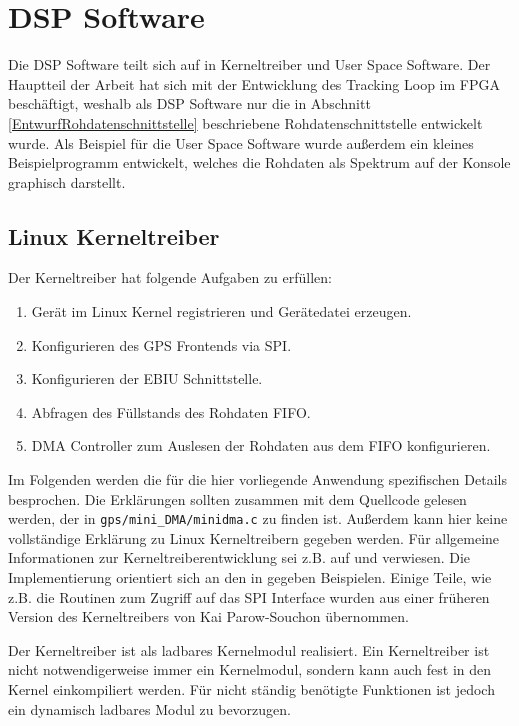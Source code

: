 \section{DSP Software}
Die DSP Software teilt sich auf in Kerneltreiber und User Space Software. Der Hauptteil der Arbeit hat sich mit der Entwicklung des Tracking Loop im FPGA beschäftigt, weshalb als DSP Software nur die in Abschnitt \ref{EntwurfRohdatenschnittstelle} beschriebene Rohdatenschnittstelle entwickelt wurde. Als Beispiel für die User Space Software wurde außerdem ein kleines Beispielprogramm entwickelt, welches die Rohdaten als Spektrum auf der Konsole graphisch darstellt. 

\subsection{Linux Kerneltreiber}\label{Kerneltreiber}
Der Kerneltreiber hat folgende Aufgaben zu erfüllen:
\begin{enumerate}
    \item Gerät im Linux Kernel registrieren und Gerätedatei erzeugen. %
    \item Konfigurieren des GPS Frontends via SPI. %
    \item Konfigurieren der EBIU Schnittstelle. %
    \item Abfragen des Füllstands des Rohdaten FIFO. %
    \item DMA Controller zum Auslesen der Rohdaten aus dem FIFO konfigurieren. %
\end{enumerate}

Im Folgenden werden die für die hier vorliegende Anwendung spezifischen Details besprochen. Die Erklärungen sollten zusammen mit dem Quellcode gelesen werden, der in \lstinline$gps/mini_DMA/minidma.c$ zu finden ist. Außerdem kann hier keine vollständige Erklärung zu Linux Kerneltreibern  gegeben werden. Für allgemeine  Informationen zur Kerneltreiberentwicklung sei z.B. auf \cite{LinuxDeviceDrivers}  und \cite{quade2015linux} verwiesen. Die Implementierung orientiert sich an den in \cite{quade2015linux} gegeben Beispielen. Einige Teile, wie z.B. die Routinen zum Zugriff auf das SPI Interface wurden aus einer früheren Version des Kerneltreibers von Kai Parow-Souchon übernommen.

Der Kerneltreiber ist als ladbares Kernelmodul realisiert. Ein Kerneltreiber ist nicht notwendigerweise immer ein Kernelmodul, sondern kann auch fest in den Kernel einkompiliert werden. Für nicht ständig benötigte Funktionen ist jedoch ein dynamisch ladbares Modul zu bevorzugen.

